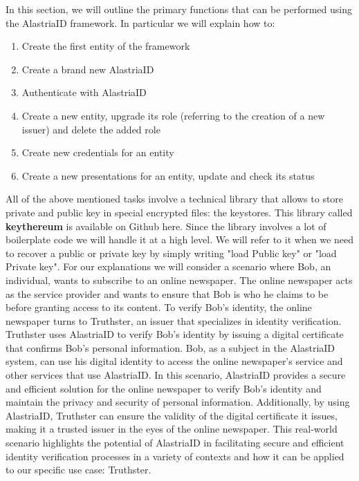 \documentclass[target=mst,aauheader=]{thud}
\begin{document}
In this section, we will outline the primary functions that can be performed using the AlastriaID framework.
In particular we will explain how to:

\begin{enumerate}

    \item Create the first entity of the framework
    \item Create a brand new AlastriaID
    \item Authenticate with AlastriaID
    \item Create a new entity, upgrade its role (referring to the creation of a new issuer) and delete the added role
    \item Create new credentials for an entity
    \item Create a new presentations for an entity, update and check its status

\end{enumerate}

All of the above mentioned tasks involve a technical library that allows to store private and public key in special encrypted files: the keystores. This library called \textbf{keythereum} is available on Github here\cite{keythereum}. Since the library involves a lot of boilerplate code we will handle it at a high level. We will refer to it when we need to recover a public or private key by simply writing "load Public key" or "load Private key".
For our explanations we will consider a scenario where Bob, an individual, wants to subscribe to an online newspaper. The online newspaper acts as the service provider and wants to ensure that Bob is who he claims to be before granting access to its content. To verify Bob's identity, the online newspaper turns to Truthster, an issuer that specializes in identity verification. Truthster uses AlastriaID to verify Bob's identity by issuing a digital certificate that confirms Bob's personal information. Bob, as a subject in the AlastriaID system, can use his digital identity to access the online newspaper's service and other services that use AlastriaID. In this scenario, AlastriaID provides a secure and efficient solution for the online newspaper to verify Bob's identity and maintain the privacy and security of personal information. Additionally, by using AlastriaID, Truthster can ensure the validity of the digital certificate it issues, making it a trusted issuer in the eyes of the online newspaper. This real-world scenario highlights the potential of AlastriaID in facilitating secure and efficient identity verification processes in a variety of contexts and how it can be applied to our specific use case: Truthster.
\end{document}
